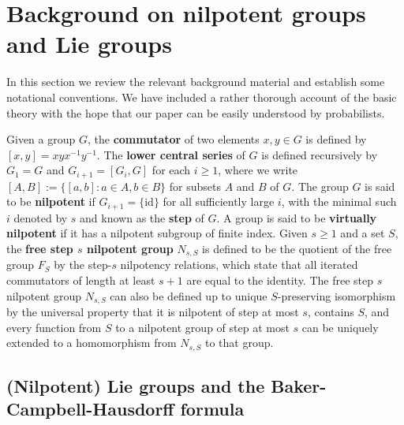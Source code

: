 \section{Background on nilpotent groups and Lie groups}

In this section we review the relevant background material and establish some notational conventions. We have included a rather thorough account of the basic theory with the hope that our paper can be easily understood by probabilists. 

\medskip

Given a group $G$, the \textbf{commutator} of two elements $x,y\in G$ is defined by $[x,y]=xyx^{-1}y^{-1}$. The \textbf{lower central series} of $G$ is defined recursively by $G_1=G$ and $G_{i+1}=[G_i,G]$ for each $i\geq 1$, where we write $[A,B]:=\{[a,b]:a\in A, b\in B\}$ for subsets $A$ and $B$ of $G$. The group $G$ is said to be \textbf{nilpotent} if $G_{i+1}=\{\mathrm{id}\}$ for all sufficiently large $i$, with the minimal such $i$ denoted by $s$ and known as the \textbf{step} of $G$. A group is said to be \textbf{virtually nilpotent} if it has a nilpotent subgroup of finite index. Given $s\geq 1$ and a set $S$, the \textbf{free step $s$ nilpotent group} $N_{s,S}$ is defined to be the quotient of the free group $F_S$ by the step-$s$ nilpotency relations, which state that all iterated commutators of length at least $s+1$ are equal to the identity. 
%
 The free step $s$ nilpotent group $N_{s,S}$ can also be defined up to unique $S$-preserving isomorphism by the universal property that it is nilpotent of step at most $s$, contains $S$, and every function from $S$ to a nilpotent group of step at most $s$ can be uniquely extended to a homomorphism from $N_{s,S}$ to that group.

\subsection{(Nilpotent) Lie groups and the Baker-Campbell-Hausdorff formula}

